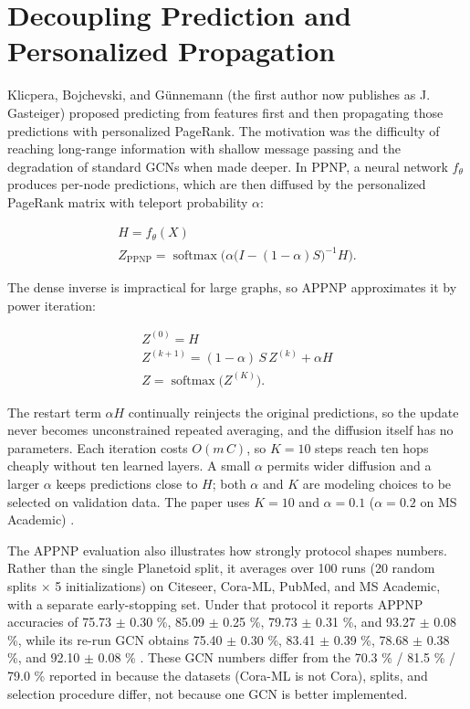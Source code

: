 \documentclass[conference]{IEEEtran}
\begin{document}
\section{Decoupling Prediction and Personalized Propagation}

Klicpera, Bojchevski, and Günnemann \cite{b6} (the first author now publishes as J. Gasteiger) proposed predicting from features first and then propagating those predictions with personalized PageRank. The motivation was the difficulty of reaching long-range information with shallow message passing and the degradation of standard GCNs when made deeper. In PPNP, a neural network \(f_\theta\) produces per-node predictions, which are then diffused by the personalized PageRank matrix with teleport probability \(\alpha\):

\[\begin{gathered}H = f_\theta(X) \\ Z_{\text{PPNP}} = \operatorname{softmax}\Big(\alpha\big(I - (1-\alpha)S\big)^{-1} H\Big).\end{gathered}\tag{11}\]

The dense inverse is impractical for large graphs, so APPNP approximates it by power iteration:

\[\begin{gathered}Z^{(0)} = H \\ Z^{(k+1)} = (1-\alpha)\,S\,Z^{(k)} + \alpha H \\ Z = \operatorname{softmax}\big(Z^{(K)}\big).\end{gathered}\tag{12}\]

The restart term \(\alpha H\) continually reinjects the original predictions, so the update never becomes unconstrained repeated averaging, and the diffusion itself has no parameters. Each iteration costs \(O(m\,C)\), so \(K=10\) steps reach ten hops cheaply without ten learned layers. A small \(\alpha\) permits wider diffusion and a larger \(\alpha\) keeps predictions close to \(H\); both \(\alpha\) and \(K\) are modeling choices to be selected on validation data. The paper uses \(K=10\) and \(\alpha=0.1\) (\(\alpha=0.2\) on MS Academic) \cite{b6}.

The APPNP evaluation also illustrates how strongly protocol shapes numbers. Rather than the single Planetoid split, it averages over 100 runs (20 random splits \ensuremath{\times} 5 initializations) on Citeseer, Cora-ML, PubMed, and MS Academic, with a separate early-stopping set. Under that protocol it reports APPNP accuracies of 75.73 \ensuremath{\pm} 0.30 \%, 85.09 \ensuremath{\pm} 0.25 \%, 79.73 \ensuremath{\pm} 0.31 \%, and 93.27 \ensuremath{\pm} 0.08 \%, while its re-run GCN obtains 75.40 \ensuremath{\pm} 0.30 \%, 83.41 \ensuremath{\pm} 0.39 \%, 78.68 \ensuremath{\pm} 0.38 \%, and 92.10 \ensuremath{\pm} 0.08 \% \cite{b6}. These GCN numbers differ from the 70.3 \% / 81.5 \% / 79.0 \% reported in \cite{b1} because the datasets (Cora-ML is not Cora), splits, and selection procedure differ, not because one GCN is better implemented.
\end{document}
